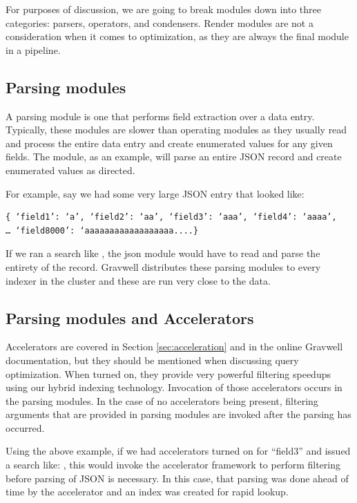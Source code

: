 For purposes of discussion, we are going to break modules
down into three categories: parsers, operators, and condensers. Render
modules are not a consideration when it comes to optimization, as they
are always the final module in a pipeline.

\subsection{Parsing modules}
A parsing module is one that performs field extraction over a data
entry. Typically, these modules are slower than operating modules as
they usually read and process the entire data entry and create
enumerated values for any given fields. The  module, as an
example, will parse an entire JSON record and create enumerated values
as directed.

For example, say we had some very large JSON entry that looked like:

\begin{Verbatim}[breaklines=true]
{ ‘field1’: ‘a’, ‘field2’: ‘aa’, ‘field3’: ‘aaa’, ‘field4’: ‘aaaa’, 
… ‘field8000’: ‘aaaaaaaaaaaaaaaaaa....}
\end{Verbatim}

If we ran a search like , the json
module would have to read and parse the entirety of the record. Gravwell
distributes these parsing modules to every indexer in the cluster and
these are run very close to the data.

\subsection{Parsing modules and Accelerators}
Accelerators are covered in Section \ref{sec:acceleration} and in the online
Gravwell documentation, but they should be mentioned when discussing query optimization.
When turned on, they provide very powerful filtering speedups using our hybrid
indexing technology. Invocation of those accelerators occurs in the
parsing modules. In the case of no accelerators being present, filtering
arguments that are provided in parsing modules are invoked after the
parsing has occurred.

Using the above example, if we had accelerators turned on for ``field3''
and issued a search like: , this would invoke the
accelerator framework to perform filtering before parsing of JSON is
necessary. In this case, that parsing was done ahead of time by the
accelerator and an index was created for rapid lookup.

